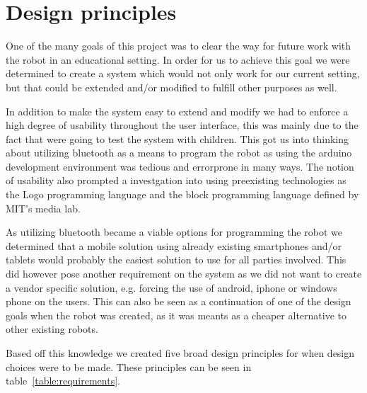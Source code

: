 \chapter{Design principles}\label{ch:principles}
One of the many goals of this project was to clear the way for future work with the \chirp robot in an educational setting. In order for us to achieve this goal we were determined to create a system which would not only work for our current setting, but that could be extended and/or modified to fulfill other purposes as well.

\bigskip\noindent
In addition to make the system easy to extend and modify we had to enforce a high degree of usability throughout the user interface, this was mainly due to the fact that were going to test the system with children. This got us into thinking about utilizing bluetooth as a means to program the robot as using the arduino development environment was tedious and errorprone in many ways. The notion of usability also prompted a investgation into using preexisting technologies as the Logo programming language and the block programming language defined by MIT's media lab. 

\bigskip\noindent
As utilizing bluetooth became a viable options for programming the robot we determined that a mobile solution using already existing smartphones and/or tablets would probably the easiest solution to use for all parties involved. This did however pose another requirement on the system as we did not want to create a vendor specific solution, e.g. forcing the use of android, iphone or windows phone on the users. 
This can also be seen as a continuation of one of the design goals when the \chirp robot was created, as it was meants as a cheaper alternative to other existing robots. 

\bigskip\noindent
Based off this knowledge we created five broad design principles for when design choices were to be made. These principles can be seen in table~\ref{table:requirements}.

